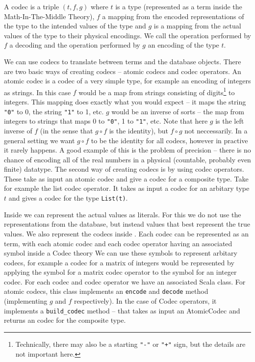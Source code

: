 \begin{mydef}[Codec]
  A codec is a triple $(t, f, g)$ where $t$ is a type (represented as a term inside the
  Math-In-The-Middle Theory), $f$ a mapping from the encoded representations of the type
  to the intended values of the type and $g$ is a mapping from the actual values of the
  type to their physical encodings. We call the operation performed by $f$ a decoding and
  the operation performed by $g$ an encoding of the type $t$.
\end{mydef}

We can use codecs to translate between \MMT terms and the database objects. There are two
basic ways of creating codecs -- atomic codecs and codec operators. An atomic codec is a
codec of a very simple type, for example an encoding of integers as strings. In this case
$f$ would be a map from strings consisting of digits\footnote{Technically, there may also
  be a starting \texttt{"-"} or \texttt{"+"} sign, but the details are not important
  here. } to integers. This mapping does exactly what you would expect -- it maps the
string \texttt{"0"} to 0, the string \texttt{"1"} to 1, etc. $g$ would be an inverse of
sorts -- the map from integers to strings that maps 0 to \texttt{"0"}, 1 to \texttt{"1"},
etc. Note that here $g$ is the left inverse of $f$ (in the sense that $g \circ f$ is the
identity), but $f \circ g$ not neccessarily. In a general setting we want $g \circ f$ to
be the identity for all codecs, however in practive it rarely happens. A good example of
this is the problem of precision -- there is no chance of encoding all of the real numbers
in a physical (countable, probably even finite) datatype.  The second way of creating
codecs is by using codec operators. These take as input an atomic codec and give a codec
for a composite type. Take for example the list codec operator. It takes as input a codec
for an arbitary type $t$ and gives a codec for the type \texttt{List(t)}.

Inside \MMT we can represent the actual values as literals. For this we do not use the
representations from the database, but instead values that best represent the true
values. We also represent the codecs inside \MMT. Each codec can be represented as an \MMT
term, with each atomic codec and each codec operator having an associated symbol inside a
Codec theory We can use these symbols to represent arbitary codecs, for example a codec
for a matrix of integers would be represented by applying the symbol for a matrix codec
operator to the symbol for an integer codec. For each codec and codec operator we have an
associated Scala class. For atomic codecs, this class implements an \texttt{encode} and
\texttt{decode} method (implementing $g$ and $f$ respectively). In the case of Codec
operators, it implements a \texttt{build\_codec} method --
that takes as input an AtomicCodec and returns an codec for the composite type.

